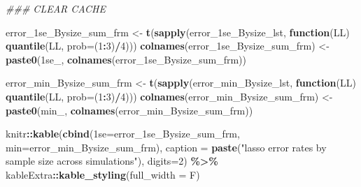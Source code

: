 \documentclass[
]{book}
\newenvironment{Shaded}{\begin{snugshade}}{\end{snugshade}}
\newcommand{\CommentTok}[1]{\textcolor[rgb]{0.56,0.35,0.01}{\textit{#1}}}
\newcommand{\ControlFlowTok}[1]{\textcolor[rgb]{0.13,0.29,0.53}{\textbf{#1}}}
\newcommand{\DataTypeTok}[1]{\textcolor[rgb]{0.13,0.29,0.53}{#1}}
\newcommand{\DecValTok}[1]{\textcolor[rgb]{0.00,0.00,0.81}{#1}}
\newcommand{\KeywordTok}[1]{\textcolor[rgb]{0.13,0.29,0.53}{\textbf{#1}}}
\newcommand{\NormalTok}[1]{#1}
\newcommand{\OperatorTok}[1]{\textcolor[rgb]{0.81,0.36,0.00}{\textbf{#1}}}
\newcommand{\StringTok}[1]{\textcolor[rgb]{0.31,0.60,0.02}{#1}}
\begin{document}
\begin{Shaded}
\begin{Highlighting}[]
\CommentTok{\#\#\# CLEAR CACHE}

\NormalTok{error\_1se\_Bysize\_sum\_frm <{-}}\StringTok{ }\KeywordTok{t}\NormalTok{(}\KeywordTok{sapply}\NormalTok{(error\_1se\_Bysize\_lst, }\ControlFlowTok{function}\NormalTok{(LL) }\KeywordTok{quantile}\NormalTok{(LL, }\DataTypeTok{prob=}\NormalTok{(}\DecValTok{1}\OperatorTok{:}\DecValTok{3}\NormalTok{)}\OperatorTok{/}\DecValTok{4}\NormalTok{)))}
\KeywordTok{colnames}\NormalTok{(error\_1se\_Bysize\_sum\_frm) <{-}}\StringTok{ }\KeywordTok{paste0}\NormalTok{(}\StringTok{\textquotesingle{}1se\_\textquotesingle{}}\NormalTok{, }\KeywordTok{colnames}\NormalTok{(error\_1se\_Bysize\_sum\_frm))}

\NormalTok{error\_min\_Bysize\_sum\_frm <{-}}\StringTok{ }\KeywordTok{t}\NormalTok{(}\KeywordTok{sapply}\NormalTok{(error\_min\_Bysize\_lst, }\ControlFlowTok{function}\NormalTok{(LL) }\KeywordTok{quantile}\NormalTok{(LL, }\DataTypeTok{prob=}\NormalTok{(}\DecValTok{1}\OperatorTok{:}\DecValTok{3}\NormalTok{)}\OperatorTok{/}\DecValTok{4}\NormalTok{)))}
\KeywordTok{colnames}\NormalTok{(error\_min\_Bysize\_sum\_frm) <{-}}\StringTok{ }\KeywordTok{paste0}\NormalTok{(}\StringTok{\textquotesingle{}min\_\textquotesingle{}}\NormalTok{, }\KeywordTok{colnames}\NormalTok{(error\_min\_Bysize\_sum\_frm))}


\NormalTok{knitr}\OperatorTok{::}\KeywordTok{kable}\NormalTok{(}\KeywordTok{cbind}\NormalTok{(}\StringTok{\textasciigrave{}}\DataTypeTok{1se}\StringTok{\textasciigrave{}}\NormalTok{=error\_1se\_Bysize\_sum\_frm, }\DataTypeTok{min=}\NormalTok{error\_min\_Bysize\_sum\_frm),}
      \DataTypeTok{caption =} \KeywordTok{paste}\NormalTok{(}\StringTok{"lasso error rates by sample size across simulations"}\NormalTok{),}
    \DataTypeTok{digits=}\DecValTok{2}\NormalTok{) }\OperatorTok{\%>\%}
\StringTok{   }\NormalTok{kableExtra}\OperatorTok{::}\KeywordTok{kable\_styling}\NormalTok{(}\DataTypeTok{full\_width =}\NormalTok{ F)}
\end{Highlighting}
\end{Shaded}
\end{document}
